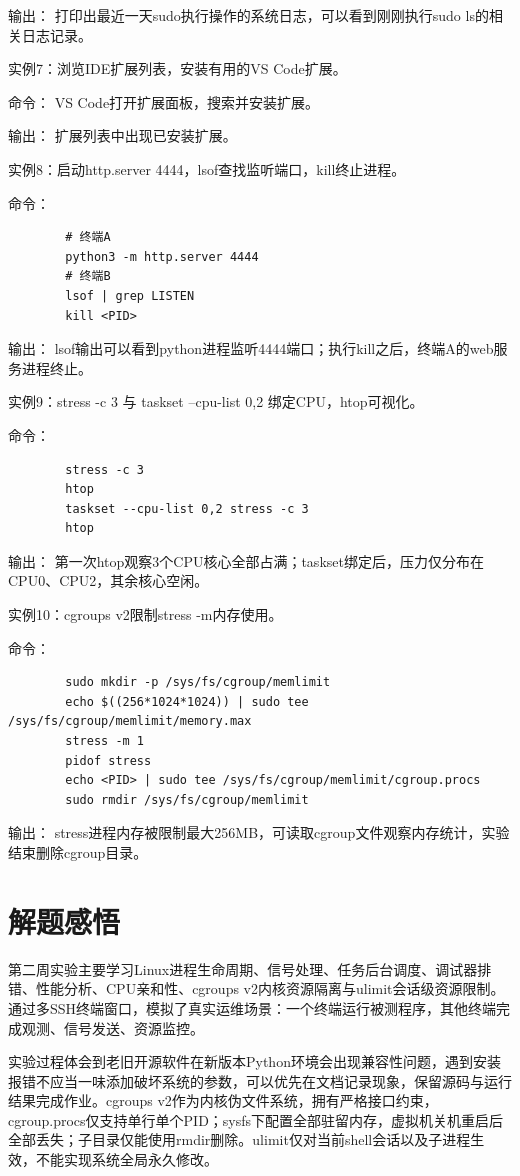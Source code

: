 \documentclass[a4paper,12pt]{ctexart}
\begin{document}
	输出：
	打印出最近一天sudo执行操作的系统日志，可以看到刚刚执行sudo ls的相关日志记录。
	
	实例7：浏览IDE扩展列表，安装有用的VS Code扩展。
	
	命令：
	VS Code打开扩展面板，搜索并安装扩展。
	
	输出：
	扩展列表中出现已安装扩展。
	
	实例8：启动http.server 4444，lsof查找监听端口，kill终止进程。
	
	命令：
	\begin{lstlisting}
		# 终端A
		python3 -m http.server 4444
		# 终端B
		lsof | grep LISTEN
		kill <PID>
	\end{lstlisting}
	
	输出：
	lsof输出可以看到python进程监听4444端口；执行kill之后，终端A的web服务进程终止。
	
	实例9：stress -c 3 与 taskset --cpu-list 0,2 绑定CPU，htop可视化。
	
	命令：
	\begin{lstlisting}
		stress -c 3
		htop
		taskset --cpu-list 0,2 stress -c 3
		htop
	\end{lstlisting}
	
	输出：
	第一次htop观察3个CPU核心全部占满；taskset绑定后，压力仅分布在CPU0、CPU2，其余核心空闲。
	
	实例10：cgroups v2限制stress -m内存使用。
	
	命令：
	\begin{lstlisting}
		sudo mkdir -p /sys/fs/cgroup/memlimit
		echo $((256*1024*1024)) | sudo tee /sys/fs/cgroup/memlimit/memory.max
		stress -m 1
		pidof stress
		echo <PID> | sudo tee /sys/fs/cgroup/memlimit/cgroup.procs
		sudo rmdir /sys/fs/cgroup/memlimit
	\end{lstlisting}
	
	输出：
	stress进程内存被限制最大256MB，可读取cgroup文件观察内存统计，实验结束删除cgroup目录。
	
	
	\section{解题感悟}

	 第二周实验主要学习Linux进程生命周期、信号处理、任务后台调度、调试器排错、性能分析、CPU亲和性、cgroups v2内核资源隔离与ulimit会话级资源限制。通过多SSH终端窗口，模拟了真实运维场景：一个终端运行被测程序，其他终端完成观测、信号发送、资源监控。
		
	 实验过程体会到老旧开源软件在新版本Python环境会出现兼容性问题，遇到安装报错不应当一味添加破坏系统的参数，可以优先在文档记录现象，保留源码与运行结果完成作业。cgroups v2作为内核伪文件系统，拥有严格接口约束，cgroup.procs仅支持单行单个PID；sysfs下配置全部驻留内存，虚拟机关机重启后全部丢失；子目录仅能使用rmdir删除。ulimit仅对当前shell会话以及子进程生效，不能实现系统全局永久修改。
		
\end{document}
